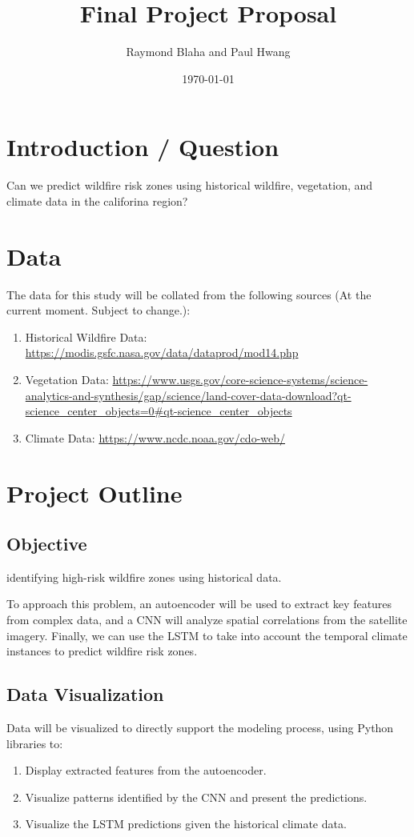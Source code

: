 \documentclass{article}
\title{Final Project Proposal}
\author{Raymond Blaha and Paul Hwang}
\date{\today}
\begin{document}
\maketitle

\section{Introduction / Question}
Can we predict wildfire risk zones using historical wildfire, vegetation, and climate data in the califorina region?

\section{Data}
The data for this study will be collated from the following sources (At the current moment. Subject to change.):
\begin{enumerate}
  \item Historical Wildfire Data: \url{https://modis.gsfc.nasa.gov/data/dataprod/mod14.php}
  \item Vegetation Data: \url{https://www.usgs.gov/core-science-systems/science-analytics-and-synthesis/gap/science/land-cover-data-download?qt-science_center_objects=0#qt-science_center_objects}
  \item Climate Data: \url{https://www.ncdc.noaa.gov/cdo-web/}
\end{enumerate}

\section{Project Outline}

\subsection{Objective}
identifying high-risk wildfire zones using historical data. 

To approach this problem, an autoencoder will be used to extract key features from complex data, 
and a CNN will analyze spatial correlations from the satellite imagery. 
Finally, we can use the LSTM to take into account the temporal climate instances to predict wildfire risk zones.

\subsection{Data Visualization}
Data will be visualized to directly support the modeling process, using Python libraries to:
\begin{enumerate}
    \item Display extracted features from the autoencoder.
    \item Visualize patterns identified by the CNN and present the predictions.
    \item Visualize the LSTM predictions given the historical climate data.
\end{enumerate}
\end{document}
